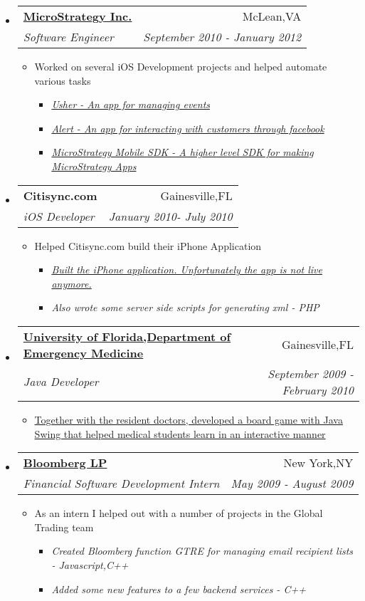 \documentclass[letterpaper,11pt]{article}
\makeatletter
\newcommand{\resitem}[1]{\item #1 \vspace{-2pt}}
\newcommand{\ressubheading}[4]{
\begin{tabular*}{7.0in}{l@{\extracolsep{\fill}}r}
    \textbf{#1} & #2 \\
    \textit{#3} & \textit{#4} \\
\end{tabular*}\vspace{-6pt}}
\makeatother
\begin{document}
\begin{itemize}
\item
    \ressubheading{\href{http://www.microstrategy.com/Company}{MicroStrategy Inc.}}{McLean,VA}{Software Engineer}{September 2010 - January 2012}
    \begin{itemize}
        \resitem{Worked on several iOS Development projects and helped automate various tasks}
        \begin{itemize}
            \resitem{\href{http://itunes.apple.com/us/app/usher-by-microstrategy/id477543403}{\emph{Usher - An app for managing events}}}
             \resitem{\href{http://itunes.apple.com/us/app/alert-for-iphone/id442981988?mt=8&ls=1}{\emph{Alert - An app for interacting with customers through facebook}}}
               \resitem{ \href{http://www.microstrategy.com/mobile/}{\emph{MicroStrategy Mobile SDK - A higher level SDK for making MicroStrategy Apps}}}
        \end{itemize}
    \end{itemize}
    

\item
    \ressubheading{Citisync.com}{Gainesville,FL}{iOS Developer}{January 2010- July 2010}
    \begin{itemize}
        \resitem{Helped Citisync.com build their iPhone Application}
        \begin{itemize}
            \resitem{\href{http://www.alligator.org/news/campus/article_8fe50876-c78b-11df-96a3-001cc4c03286.html}{\emph{Built the iPhone application. Unfortunately the app is not live anymore.}}}
           \resitem{\emph{Also wrote some server side scripts for generating xml - PHP}}
        \end{itemize}
    \end{itemize}

\item
    \ressubheading{\href{http://emergency.med.ufl.edu}{University of Florida,Department of Emergency Medicine}}{Gainesville,FL}{Java Developer}{September 2009 - February 2010}
    \begin{itemize}
        \resitem{\href{http://onlinelibrary.wiley.com/doi/10.1111/j.1553-2712.2009.00392_16.x/abstract}{Together with the resident doctors, developed a board game with Java Swing that helped medical students learn in an interactive manner}}
    \end{itemize}
                
\item
    \ressubheading{\href{http://www.bloomberg.com}{Bloomberg LP}}{New York,NY}{Financial Software Development Intern}{May 2009 - August 2009}
    \begin{itemize}
      \resitem{As an intern I helped out with a number of projects in the Global Trading team}
        \begin{itemize}
             \resitem{\emph{Created Bloomberg function GTRE for managing email recipient lists - Javascript,C++}}
            \resitem{\emph{Added some new features to a few backend services - C++ }}
         \end{itemize}
    \end{itemize}
    
    
\end{itemize}
\end{document}

